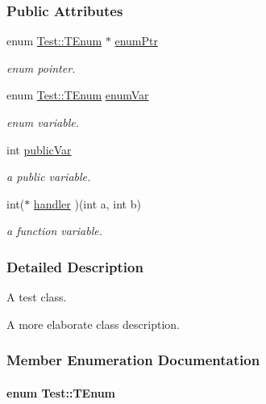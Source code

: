 \subsubsection*{Public Attributes}
\begin{DoxyCompactItemize}
\item 
enum \hyperlink{classTest_ad8d13fe56b896633273087859b89a1a3}{Test\-::\-T\-Enum} $\ast$ \hyperlink{classTest_add1f72d205230e7bac3fcc70a65c1de2}{enum\-Ptr}
\begin{DoxyCompactList}\small\item\em enum pointer. \end{DoxyCompactList}\item 
enum \hyperlink{classTest_ad8d13fe56b896633273087859b89a1a3}{Test\-::\-T\-Enum} \hyperlink{classTest_a0bd371828a36ad7ea83dfd07b2a672b5}{enum\-Var}
\begin{DoxyCompactList}\small\item\em enum variable. \end{DoxyCompactList}\item 
int \hyperlink{classTest_a3085f973ef857d85d647bf04e89760d0}{public\-Var}
\begin{DoxyCompactList}\small\item\em a public variable. \end{DoxyCompactList}\item 
int($\ast$ \hyperlink{classTest_a8bef142724c4059c18f752e630a4d925}{handler} )(int a, int b)
\begin{DoxyCompactList}\small\item\em a function variable. \end{DoxyCompactList}\end{DoxyCompactItemize}


\subsubsection{Detailed Description}
A test class. 

A more elaborate class description. 

\subsubsection{Member Enumeration Documentation}
\hypertarget{classTest_ad8d13fe56b896633273087859b89a1a3}{
\paragraph[{T\-Enum}]{\setlength{\rightskip}{0pt plus 5cm}enum {\bf Test\-::\-T\-Enum}}}\label{classTest_ad8d13fe56b896633273087859b89a1a3}


